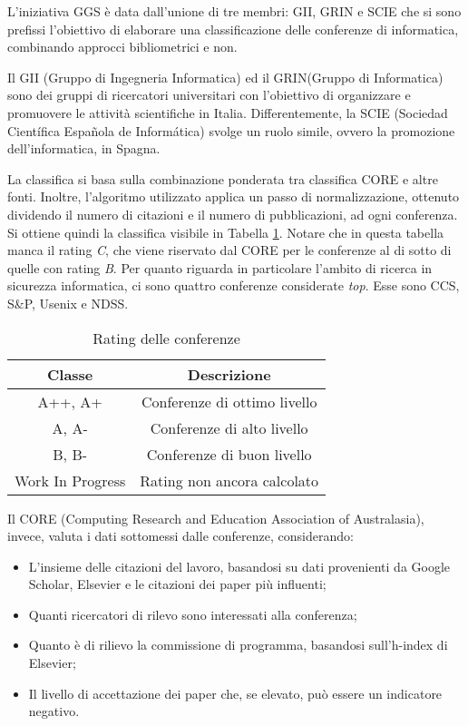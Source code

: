 L'iniziativa GGS è data dall'unione di tre membri: GII, GRIN e SCIE che si sono prefissi l'obiettivo di elaborare una classificazione delle conferenze di informatica, combinando approcci bibliometrici e non.

Il GII (Gruppo di Ingegneria Informatica) \cite{gii} ed il GRIN(Gruppo di Informatica) \cite{grin} sono dei gruppi di ricercatori universitari con l'obiettivo di organizzare e promuovere le attività scientifiche in Italia. Differentemente, la SCIE (Sociedad Científica Española de Informática) svolge un ruolo simile, ovvero la promozione dell'informatica, in Spagna.

La classifica \cite{ggsRatingPdf} si basa sulla combinazione ponderata tra classifica CORE e altre fonti. Inoltre, l'algoritmo utilizzato applica un passo di normalizzazione, ottenuto dividendo il numero di citazioni e il numero di pubblicazioni, ad ogni conferenza.
Si ottiene quindi la classifica visibile in Tabella \ref{table:ratings}.
Notare che in questa tabella manca il rating \textit{C}, che viene riservato
dal CORE per le conferenze al di sotto di quelle con rating \textit{B}.
Per quanto riguarda in particolare l'ambito di ricerca in sicurezza informatica,
ci sono quattro conferenze considerate \textit{top}. Esse sono CCS, S\&P, Usenix
e NDSS.

\begin{table}
    \centering
    \begin{tabular}{||c c ||} 
     \hline
     Classe & Descrizione \\ [0.5ex] 
     \hline\hline
     A++, A+ & Conferenze di ottimo livello \\ 
     \hline
     A, A- & Conferenze di alto livello \\
     \hline
     B, B- & Conferenze di buon livello \\
     \hline
     Work In Progress & Rating non ancora calcolato \\
     \hline
    \end{tabular}
    \caption{Rating delle conferenze}
    \label{table:ratings}
\end{table}

Il CORE (Computing Research and Education Association of Australasia), invece, valuta i dati sottomessi dalle conferenze, considerando:
\begin{itemize}
    \item L'insieme delle citazioni del lavoro, basandosi su dati provenienti da Google Scholar, Elsevier e le citazioni dei paper più influenti; 
    \item Quanti ricercatori di rilevo sono interessati alla conferenza;
    \item Quanto è di rilievo la commissione di programma, basandosi sull'h-index di Elsevier;
    \item Il livello di accettazione dei paper che, se elevato, può essere un indicatore negativo.
\end{itemize}

